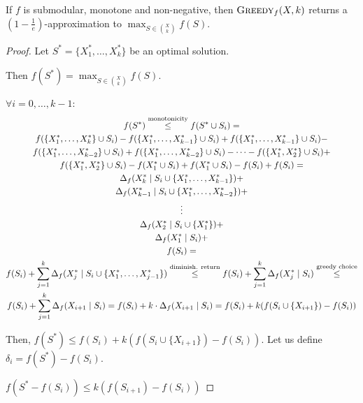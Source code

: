     \begin{theorem}
        If $f$ is submodular, monotone and non-negative, then $\textsc{Greedy}_f(X,k)$ returns a $(1 - \frac{1}{e})$-approximation to $\max_{S \in \binom{X}{k}} f(S)$.
    \end{theorem}

    \begin{proof}
        Let $S^* = \{ X_1^*, \dots, X_k^* \}$ be an optimal solution.
        
        Then $f(S^*) = \max_{S \in \binom{X}{k}} f(S)$.

        $\forall i = 0, \dots, k-1$:
        \begin{multline*}
            f(S^*) \overset{\text{monotonicity}}{\leq} f(S^* \cup S_i) =\\
            f(\{ X_1^*, \dots, X_k^* \} \cup S_i) - f(\{ X_1^*, \dots, X_{k-1}^*\} \cup S_i) + f(\{ X_1^*, \dots, X_{k-1}^* \} \cup S_i) -\\
            f(\{ X_1^*, \dots, X_{k-2}^* \} \cup S_i)  + f(\{ X_1^*, \dots, X_{k-2}^* \} \cup S_i)  - \cdots - f(\{ X_1^*, X_2^*\} \cup S_i) + \\
            f(\{ X_1^*, X_2^*\} \cup S_i)  - f({X_1^*} \cup S_i) + f({X_1^*} \cup S_i) - f(S_i) + f(S_i) =\\
            \Delta_f(X_{k}^* \; \vert \; S_i \cup \{ X_1^*, \dots, X_{k-1}^* \}) +\\
            \Delta_f(X_{k-1}^* \; \vert \; S_i \cup \{ X_1^*, \dots, X_{k-2}^* \}) +\\
            \vdots\\
            \Delta_f(X_{2}^* \; \vert \; S_i \cup \{ X_1^*\}) +\\
            \Delta_f(X_{1}^* \; \vert \; S_i) +\\
            f(S_i) =\\
            f(S_i) + \sum_{j=1}^{k} \Delta_f(X_j^* \; \vert \; S_i \cup \{ X_1^*, \dots, X_{j-1}^* \}) \overset{\text{diminish. return}}{\leq} f(S_i) + \sum_{j=1}^{k} \Delta_f(X_j^* \; \vert \; S_i) \overset{\text{greedy choice}}{\leq}\\
            f(S_i) + \sum_{j=1}^{k} \Delta_f(X_{i+1} \; \vert \; S_i) = f(S_i) + k \cdot \Delta_f(X_{i+1} \; \vert \; S_i) = f(S_i) + k (f(S_i \cup \{ X_{i+1} \}) - f(S_i))
        \end{multline*}

        Then, $f(S^*) \leq f(S_i) + k (f(S_i \cup \{ X_{i+1} \}) - f(S_i))$.
        Let us define $\delta_i = f(S^*) - f(S_i)$.

        $f(S^* - f(S_i)) \leq k (f(S_{i+1}) - f(S_i))$


\end{proof}

